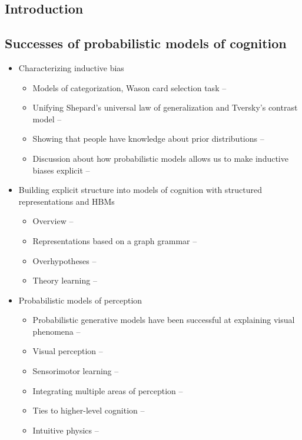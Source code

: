 \documentclass[12pt]{article}
\begin{document}

\subsection*{Introduction}

\subsection*{Successes of probabilistic models of cognition}

\begin{itemize}
\item Characterizing inductive bias
    \begin{itemize}
    \item Models of categorization, Wason card selection task -- \citep{Chater1999}
    \item Unifying Shepard's universal law of generalization and Tversky's contrast model -- \citep{Tenenbaum2001}
    \item Showing that people have knowledge about prior distributions -- \citep{Griffiths2009}
    \item Discussion about how probabilistic models allows us to make inductive biases explicit -- \citep{Griffiths2010}
    \end{itemize}

\item Building explicit structure into models of cognition with structured representations and HBMs
    \begin{itemize}
    \item Overview -- \citep{Tenenbaum2011}
    \item Representations based on a graph grammar -- \citep{Kemp2008}
    \item Overhypotheses -- \citep{Kemp2007}
    \item Theory learning -- \citep{Griffiths2009,Kemp2010,Ullman2012}
    \end{itemize}

\item Probabilistic models of perception
    \begin{itemize}
    \item Probabilistic generative models have been successful at explaining visual phenomena -- \citep{Battaglia2012}
    \item Visual perception -- \citep{Weiss2002}
    \item Sensorimotor learning -- \citep{Kording2004}
    \item Integrating multiple areas of perception -- \citep{Ernst2002}
    \item Ties to higher-level cognition -- \citep{Yuille2006}
    \item Intuitive physics -- \citep{Teglas2011,Sanborn2013}
    \end{itemize}


\end{itemize}
\end{document}
